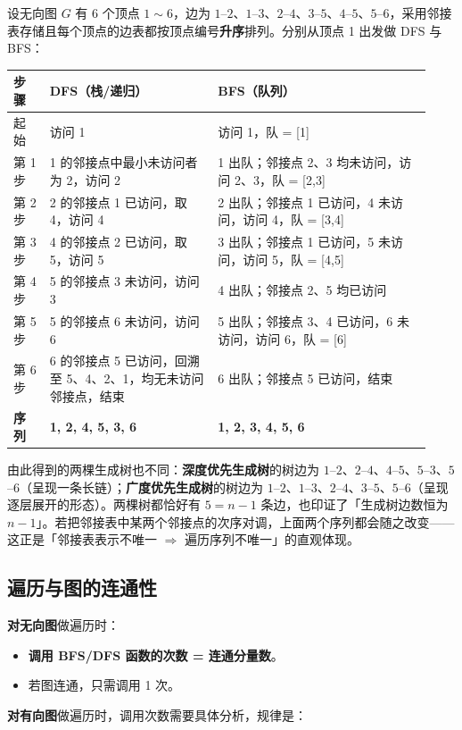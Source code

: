 \documentclass[11pt,openany,UTF8]{ctexbook}
\begin{document}
设无向图 $G$ 有 6 个顶点 $1\sim 6$，边为 $1$–$2$、$1$–$3$、$2$–$4$、$3$–$5$、$4$–$5$、$5$–$6$，采用邻接表存储且每个顶点的边表都按顶点编号\textbf{升序}排列。分别从顶点 1 出发做 DFS 与 BFS：

\begingroup\small\setlength{\tabcolsep}{4.0pt}
\begin{longtable}{@{}L{0.0823\linewidth}L{0.3705\linewidth}L{0.4757\linewidth}@{}}
\toprule
\textbf{步骤} & \textbf{DFS（栈/递归）} & \textbf{BFS（队列）} \\
\midrule
\endhead
起始 & 访问 1 & 访问 1，队 = [1] \\
第 1 步 & 1 的邻接点中最小未访问者为 2，访问 2 & 1 出队；邻接点 2、3 均未访问，访问 2、3，队 = [2,3] \\
第 2 步 & 2 的邻接点 1 已访问，取 4，访问 4 & 2 出队；邻接点 1 已访问，4 未访问，访问 4，队 = [3,4] \\
第 3 步 & 4 的邻接点 2 已访问，取 5，访问 5 & 3 出队；邻接点 1 已访问，5 未访问，访问 5，队 = [4,5] \\
第 4 步 & 5 的邻接点 3 未访问，访问 3 & 4 出队；邻接点 2、5 均已访问 \\
第 5 步 & 5 的邻接点 6 未访问，访问 6 & 5 出队；邻接点 3、4 已访问，6 未访问，访问 6，队 = [6] \\
第 6 步 & 6 的邻接点 5 已访问，回溯至 5、4、2、1，均无未访问邻接点，结束 & 6 出队；邻接点 5 已访问，结束 \\
\textbf{序列} & \textbf{1, 2, 4, 5, 3, 6} & \textbf{1, 2, 3, 4, 5, 6} \\
\bottomrule
\end{longtable}
\endgroup

由此得到的两棵生成树也不同：\textbf{深度优先生成树}的树边为 $1$–$2$、$2$–$4$、$4$–$5$、$5$–$3$、$5$–$6$（呈现一条长链）；\textbf{广度优先生成树}的树边为 $1$–$2$、$1$–$3$、$2$–$4$、$3$–$5$、$5$–$6$（呈现逐层展开的形态）。两棵树都恰好有 $5 = n-1$ 条边，也印证了「生成树边数恒为 $n-1$」。若把邻接表中某两个邻接点的次序对调，上面两个序列都会随之改变——这正是「邻接表表示不唯一 $\Rightarrow$ 遍历序列不唯一」的直观体现。

\subsection{遍历与图的连通性}

\textbf{对无向图}做遍历时：

\begin{itemize}
\item \textbf{调用 BFS/DFS 函数的次数 = 连通分量数}。
\item 若图连通，只需调用 1 次。
\end{itemize}
\textbf{对有向图}做遍历时，调用次数需要具体分析，规律是：
\end{document}
